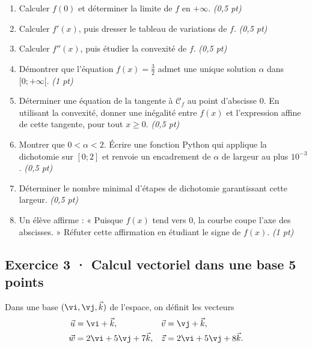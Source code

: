 \begin{enumerate}

\item Calculer $f(0)$ et déterminer la limite de $f$ en $+\infty$. \hfill\textit{(0,5 pt)}

\item Calculer $f' (x)$, puis dresser le tableau de variations de $f$. \hfill\textit{(0,5 pt)}

\item Calculer $f'' (x)$, puis étudier la convexité de $f$. \hfill\textit{(0,5 pt)}

\item Démontrer que l'équation $f(x)=\frac{3}{2}$ admet une unique solution $\alpha$ dans $[0;+\infty[$. \hfill\textit{(1 pt)}

\item Déterminer une équation de la tangente à $\mathcal C_f$ au point d'abscisse $0$. En utilisant la convexité, donner une inégalité entre $f(x)$ et l'expression affine de cette tangente, pour tout $x\ge0$. \hfill\textit{(0,5 pt)}

\item Montrer que $0<\alpha<2$. Écrire une fonction Python qui applique la dichotomie sur $[0;2]$ et renvoie un encadrement de $\alpha$ de largeur au plus $10^{-3}$. \hfill\textit{(0,5 pt)}

\item Déterminer le nombre minimal d'étapes de dichotomie garantissant cette largeur. \hfill\textit{(0,5 pt)}

\item Un élève affirme : « Puisque $f(x)$ tend vers $0$, la courbe coupe l'axe des abscisses. » Réfuter cette affirmation en étudiant le signe de $f(x)$. \hfill\textit{(1 pt)}

\end{enumerate}

\clearpage{}\par

\subsection*{Exercice 3 · Calcul vectoriel dans une base \hfill 5 points}Dans une base $(\vi,\vj,\vec k)$ de l'espace, on définit les vecteurs
\[\begin{aligned}\vec u&=\vi+\vec k,&\vec v&=\vj+\vec k,\\
\vec w&=2\vi+5\vj+7\vec k,&\vec z&=2\vi+5\vj+8\vec k.\end{aligned}\]

